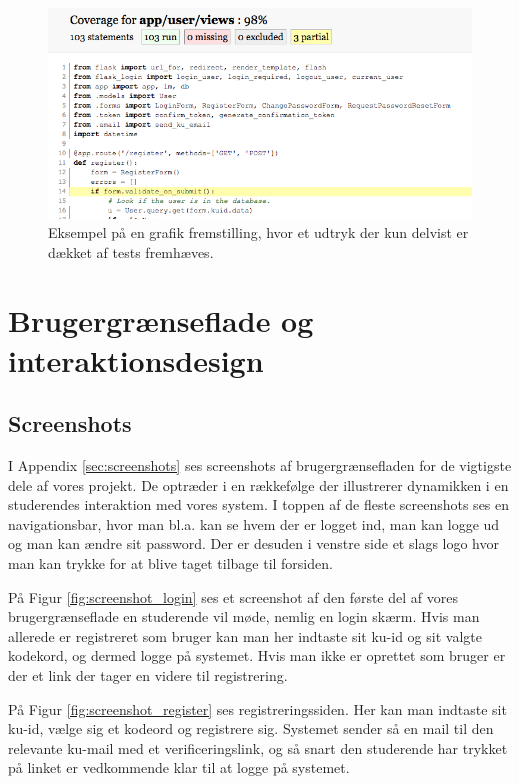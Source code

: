 \documentclass[11pt, a4paper]{article}
\begin{document}
\begin{figure}[h]
    \centering
    \includegraphics[width=0.8\linewidth]{figures/code_coverage.png}
    \caption{Eksempel på en grafik fremstilling, hvor et udtryk der kun delvist er dækket af tests fremhæves.}
    \label{fig:code_coverage}
\end{figure}

\section{Brugergrænseflade og interaktionsdesign}
\label{sec:brugergraenseflade}
\subsection{Screenshots}
I Appendix \ref{sec:screenshots} ses screenshots af brugergrænsefladen for de vigtigste dele af vores projekt. De optræder i en rækkefølge der illustrerer dynamikken i en studerendes interaktion med vores system. I toppen af de fleste screenshots ses en navigationsbar, hvor man bl.a. kan se hvem der er logget ind, man kan logge ud og man kan ændre sit password. Der er desuden i venstre side et slags logo hvor man kan trykke for at blive taget tilbage til forsiden.

På Figur \ref{fig:screenshot_login} ses et screenshot af den første del af vores brugergrænseflade en studerende vil møde, nemlig en login skærm. Hvis man allerede er registreret som bruger kan man her indtaste sit ku-id og sit valgte kodekord, og dermed logge på systemet. Hvis man ikke er oprettet som bruger er der et link der tager en videre til registrering. 

På Figur \ref{fig:screenshot_register} ses registreringssiden. Her kan man indtaste sit ku-id, vælge sig et kodeord og registrere sig. Systemet sender så en mail til den relevante ku-mail med et verificeringslink, og så snart den studerende har trykket på linket er vedkommende klar til at logge på systemet.
\end{document}
